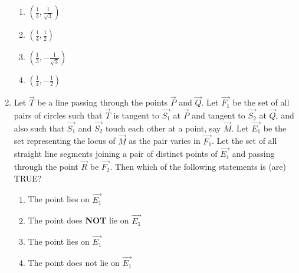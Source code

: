 \documentclass[journal,12pt,twocolumn]{IEEEtran}
\theoremstyle{remark}
\begin{document}
\begin{enumerate}
\hfill {}
\begin{enumerate}[label=(\alph*)]
\item $\left(\frac{1}{3}, \frac{1}{\sqrt{3}}\right)$
\item $\left(\frac{1}{4}, \frac{1}{2} \right)$
\item $\left(\frac{1}{3}, -\frac{1}{\sqrt{3}} \right)$
\item $\left(\frac{1}{4}, -\frac{1}{2}\right)$
\end{enumerate}
\item Let $\vec{T}$ be a line passing through the points $\vec{P}$ and $\vec{Q}$. Let $\vec{F_1}$ be the set of all pairs of circles  such that $\vec{T}$ is tangent to $\vec{S_1}$ at $\vec{P}$ and tangent to $\vec{S_2}$ at $\vec{Q}$, and also such that $\vec{S_1}$ and $\vec{S_2}$ touch each other at a point, say $\vec{M}$. Let $\vec{E_1}$ be the set representing the locus of $\vec{M}$ as the pair  varies in $\vec{F_1}$. Let the set of all straight line segments joining a pair of distinct points of $\vec{E_1}$ and passing through the point $\vec{R}$ be $\vec{F_2}$. Then which of the following statements is (are) TRUE?

\hfill{}
\begin{enumerate}
\item The point  lies on $\vec{E_1}$
\item The point  does \textbf{NOT} lie on $\vec{E_1}$
\item The point  lies on $\vec{E_1}$
\item The point  does not lie on $\vec{E_1}$
\end{enumerate}
\end{enumerate}
\end{document}

